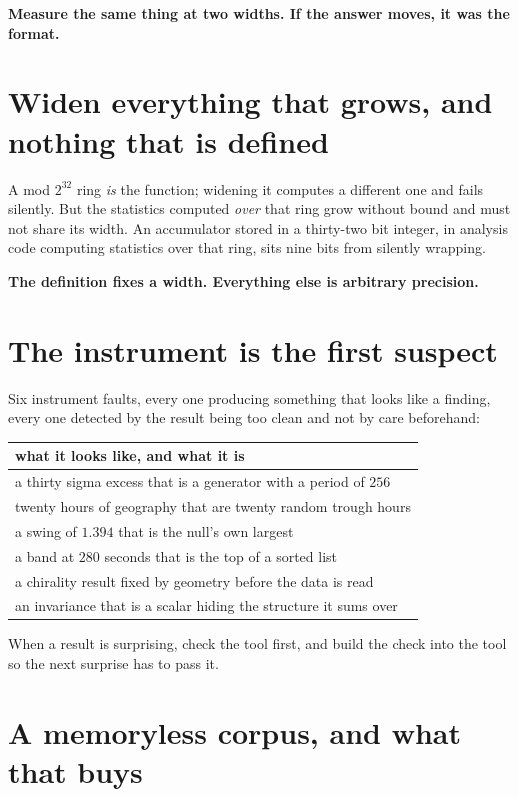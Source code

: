 \textbf{Measure the same thing at two widths. If the answer moves, it was the format.}

\section{Widen everything that grows, and nothing that is defined}

A mod \(2^{32}\) ring \emph{is} the function; widening it computes a different one and fails silently. But the statistics computed \emph{over} that ring grow without bound and must not share its width. An accumulator stored in a thirty-two bit integer, in analysis code computing statistics over that ring, sits nine bits from silently wrapping.

\textbf{The definition fixes a width. Everything else is arbitrary precision.}

\section{The instrument is the first suspect}

Six instrument faults, every one producing something that looks like a finding, every one detected by the result being too clean and not by care beforehand:

\begin{center}
\begin{tabular}{@{}l@{}}
\toprule
what it looks like, and what it is \\
\midrule
a thirty sigma excess that is a generator with a period of \(256\) \\
twenty hours of geography that are twenty random trough hours \\
a swing of \(1.394\) that is the null's own largest \\
a band at \(280\) seconds that is the top of a sorted list \\
a chirality result fixed by geometry before the data is read \\
an invariance that is a scalar hiding the structure it sums over \\
\bottomrule
\end{tabular}
\end{center}

When a result is surprising, check the tool first, and build the check into the tool so the next surprise has to pass it.

\section{A memoryless corpus, and what that buys}

